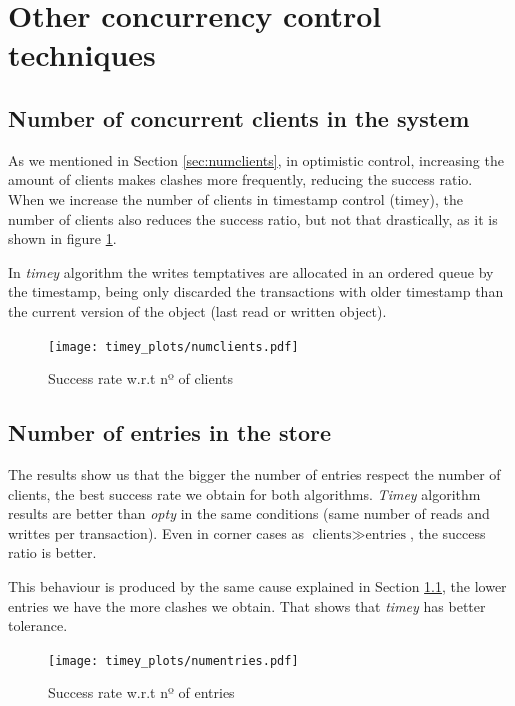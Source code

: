 \documentclass[a4paper, 10pt]{article}
\begin{document}
\clearpage
\section{Other concurrency control techniques}


\subsection{Number of concurrent clients in the system}\label{timey-current-clients}

As we mentioned in Section \ref{sec:numclients}, in optimistic control, increasing the amount of clients makes clashes more frequently, reducing the success ratio. When we increase the number of clients in timestamp control (timey), the number of clients also reduces the success ratio, but not that drastically, as it is shown in figure \ref{timey:numclients}. 

In \textit{timey} algorithm the writes temptatives are allocated in an ordered queue by the timestamp, being only discarded the transactions with older timestamp than the current version of the object (last read or written object).

\begin{figure}[H]
  \centering
  \texttt{[image: timey\_plots/numclients.pdf]}
    \caption{Success rate w.r.t nº of clients}
    \label{timey:numclients}
\end{figure} 

\clearpage
\subsection{Number of entries in the store}

The results show us that the bigger the number of entries respect the number of clients, the best success rate we obtain for both algorithms. \textit{Timey} algorithm results are better than \textit{opty} in the same conditions (same number of reads and writtes per transaction). Even in corner cases as $\text{clients} \gg \text{entries}$, the success ratio is better. 

This behaviour is produced by the same cause explained in Section \ref{timey-current-clients}, the lower entries we have the more clashes we obtain. That shows that \textit{timey} has better tolerance.

\begin{figure}[H]
  \centering
  \texttt{[image: timey\_plots/numentries.pdf]}
    \caption{Success rate w.r.t nº of entries}
    \label{timey:numentries}
\end{figure} 
\end{document}
